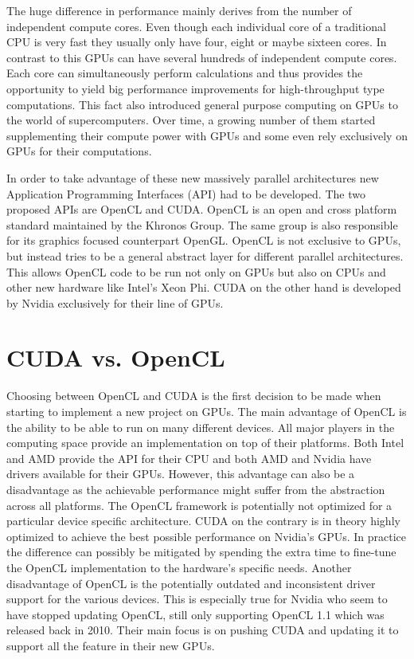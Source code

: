 \documentclass[a4paper,11pt]{kth-mag}
\begin{document}
The huge difference in performance mainly derives from the number of independent compute cores. Even though each individual core of a traditional CPU is very fast they usually only have four, eight or maybe sixteen cores. In contrast to this GPUs can have several hundreds of independent compute cores. Each core can simultaneously perform calculations and thus provides the opportunity to yield big performance improvements for high-throughput type computations. This fact also introduced general purpose computing on GPUs to the world of supercomputers. Over time, a growing number of them started supplementing their compute power with GPUs and some even rely exclusively on GPUs for their computations.

In order to take advantage of these new massively parallel architectures new Application Programming Interfaces (API) had to be developed. The two proposed APIs are OpenCL and CUDA. OpenCL is an open and cross platform standard maintained by the Khronos Group. The same group is also responsible for its graphics focused counterpart OpenGL. OpenCL is not exclusive to GPUs, but instead tries to be a general abstract layer for different parallel architectures. This allows OpenCL code to be run not only on GPUs but also on CPUs and other new hardware like Intel's Xeon Phi. CUDA on the other hand is developed by Nvidia exclusively for their line of GPUs.

\section{CUDA vs. OpenCL}

Choosing between OpenCL and CUDA is the first decision to be made when starting to implement a new project on GPUs. The main advantage of OpenCL is the ability to be able to run on many different devices. All major players in the computing space provide an implementation on top of their platforms. Both Intel and AMD provide the API for their CPU and both AMD and Nvidia have drivers available for their GPUs. However, this advantage can also be a disadvantage as the achievable performance might suffer from the abstraction across all platforms. The OpenCL framework is potentially not optimized for a particular device specific architecture. CUDA on the contrary is in theory highly optimized to achieve the best possible performance on Nvidia's GPUs. In practice the difference can possibly be mitigated by spending the extra time to fine-tune the OpenCL implementation to the hardware's specific needs. Another disadvantage of OpenCL is the potentially outdated and inconsistent driver support for the various devices. This is especially true for Nvidia who seem to have stopped updating OpenCL, still only supporting OpenCL 1.1 which was released back in 2010. Their main focus is on pushing CUDA and updating it to support all the feature in their new GPUs.
\end{document}
